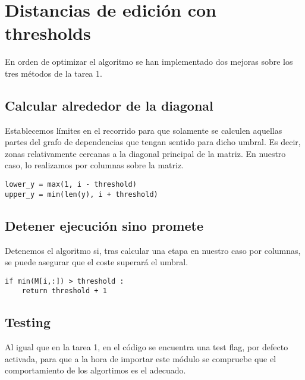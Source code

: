 \section{Distancias de edición con thresholds}
En orden de optimizar el algoritmo se han implementado dos mejoras sobre los tres métodos de la tarea 1.
\subsection{Calcular alrededor de la diagonal}
Establecemos límites en el recorrido para que solamente se calculen aquellas partes del grafo de dependencias que tengan sentido para dicho umbral.
Es decir, zonas relativamente cercanas a la diagonal principal de la matriz. En nuestro caso, lo realizamos por columnas sobre la matriz.
        

\begin{lstlisting}[caption=Calculo de los umbrales]
lower_y = max(1, i - threshold)
upper_y = min(len(y), i + threshold)
\end{lstlisting}

\subsection{Detener ejecución sino promete}
Detenemos el algoritmo si, tras calcular una etapa en nuestro caso por columnas, se puede asegurar que el coste superará el umbral.

\begin{lstlisting}[caption=Parar ejecución sino promete]
if min(M[i,:]) > threshold :
    return threshold + 1
\end{lstlisting}


\subsection{Testing}
Al igual que en la tarea 1, en el código se encuentra una test flag, por defecto activada, para que a la hora de importar este módulo se compruebe que el comportamiento de los algortimos es el adecuado.

\newpage